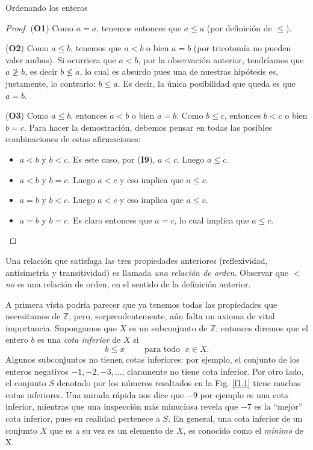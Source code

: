 \begin{section}{Ordenando los enteros}
\begin{ejemplo}
\begin{proof}
(\textbf{O1}) Como $a=a$, tenemos entonces que $a \le a$ (por definición de $\le$).

(\textbf{O2}) Como $a \le b$, tenemos que $a<b$ o bien $a=b$ (por tricotomía no pueden valer ambas). Si ocurriera que $a<b$, por la observación anterior, tendríamos que $a\not\ge b$, es decir $b\not\le a$, lo cual es absurdo pues una de nuestras hipótesis es,  justamente, lo contrario:  $b \le a$.  Es decir, la única posibilidad que queda es que $a=b$.     

(\textbf{O3}) Como $a\le b$, entonces $a <b$ o bien $a=b$. Como $b\le c$, entonces $b<c$ o bien $b=c$. Para hacer la demostración, debemos pensar en todas las posibles combinaciones de estas afirmaciones:
\begin{itemize}
    \item $a<b$ y $b<c$. Es este caso, por  (\textbf{I9}), $a<c$. Luego $a\le c$.
    
    \item $a<b$ y $b=c$. Luego $a<c$ y eso implica que $a\le c$.
    
    \item $a=b$ y $b<c$. Luego $a<c$ y eso implica que $a\le c$.
    
    \item $a=b$ y $b=c$. Es claro entonces que $a=c$, lo cual implica que $a\le c$.
\end{itemize}    
\end{proof}
\end{ejemplo}

Una relación que satisfaga las tres propiedades anteriores (reflexividad, antisimetría y transitividad) es llamada {\em una relación de orden}. Observar que $<$ {\em no} es una relación de orden, en el sentido de la definición anterior. 

A primera vista podría parecer que ya tenemos todas las propiedades que necesitamos de $\mathbb Z$, pero, sorprendentemente, aún falta un axioma de vital importancia. Supongamos que $X$ es un subconjunto de $\mathbb Z$; entonces diremos que el entero $b$ es una {\em cota inferior} de $X$ si
$$
b\le x \qquad \text{ para todo } \ x \in X.
$$
Algunos subconjuntos no tienen cotas inferiores: por ejemplo, el conjunto de los enteros negativos $-1, -2, -3, \ldots$, claramente no tiene cota inferior. Por otro lado, el conjunto $S$ denotado por los números resaltados en la Fig. \ref{f1.1} tiene muchas cotas inferiores. Una mirada rápida nos dice que $-9$ por ejemplo es una cota inferior, mientras que una inspección más minuciosa revela que $-7$ es la ``mejor'' cota inferior, pues en realidad pertenece a $S$. En general, una cota inferior de un conjunto $X$ que es a su vez es un elemento de $X$, es conocido como el {\em mínimo} de X.


\end{section}
